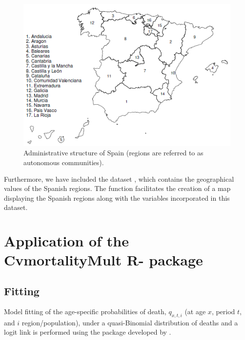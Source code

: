 \begin{figure}[h!]
\begin{center}
\includegraphics*[width=\textwidth]{mapa_cas.png}
\caption{Administrative structure of Spain (regions are referred to as autonomous communities).}
\label{Spainmap}
\end{center}
\end{figure}

Furthermore, we have included the dataset , which contains the geographical values of the Spanish regions. The  function facilitates the creation of a map displaying the Spanish regions along with the variables incorporated in this dataset.

\section{Application of the CvmortalityMult R- package} \label{sec:application}

\subsection{Fitting} \label{sec:fitting}

Model fitting of the age-specific probabilities of death, $q_{x,t,i}$ (at age $x$, period $t$, and $i$ region/population), under a quasi-Binomial distribution of deaths and a logit link is performed using the  package developed by \citet{Turner2023}.

